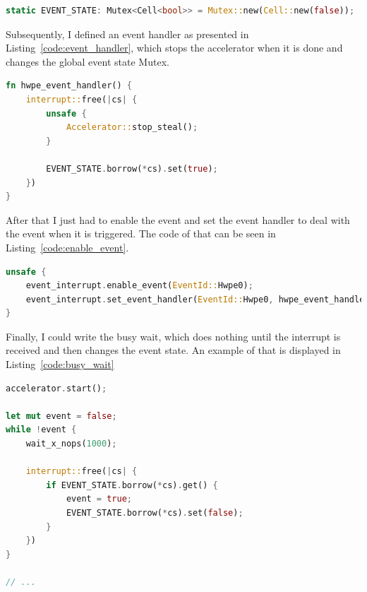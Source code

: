 \begin{lstlisting}[style=colorEX,language=Rust,caption={Definition of the necessary Mutexes},label={code:mutex}]
static EVENT_STATE: Mutex<Cell<bool>> = Mutex::new(Cell::new(false));
\end{lstlisting}

Subsequently, I defined an event handler as presented in Listing~\ref{code:event_handler}, which
stops the accelerator when it is done and changes the global event state Mutex.

\begin{minipage}{\textwidth}
\begin{lstlisting}[style=colorEX,language=Rust,caption={Event handler function},label={code:event_handler}]
fn hwpe_event_handler() {
    interrupt::free(|cs| {
        unsafe {
            Accelerator::stop_steal();
        }

        EVENT_STATE.borrow(*cs).set(true);
    })
}
\end{lstlisting}
\end{minipage}

After that I just had to enable the event and set the event handler to deal with the event when it is triggered.
The code of that can be seen in Listing~\ref{code:enable_event}.

\begin{minipage}{\textwidth}
\begin{lstlisting}[style=colorEX,language=Rust,caption={Code to enable the hardware event and set the handler},label={code:enable_event}]
unsafe {
    event_interrupt.enable_event(EventId::Hwpe0);
    event_interrupt.set_event_handler(EventId::Hwpe0, hwpe_event_handler);
}
\end{lstlisting}
\end{minipage}

Finally, I could write the busy wait, which does nothing until the interrupt is received
and then changes the event state.
An example of that is displayed in Listing~\ref{code:busy_wait}

\begin{minipage}{\textwidth}
\begin{lstlisting}[style=colorEX,language=Rust,caption={Snippet of the busy wait that waits for UltraTrail to finish},label={code:busy_wait}]
accelerator.start();

let mut event = false;
while !event {
    wait_x_nops(1000);

    interrupt::free(|cs| {
        if EVENT_STATE.borrow(*cs).get() {
            event = true;
            EVENT_STATE.borrow(*cs).set(false);
        }
    })
}

// ...
\end{lstlisting}
\end{minipage}

